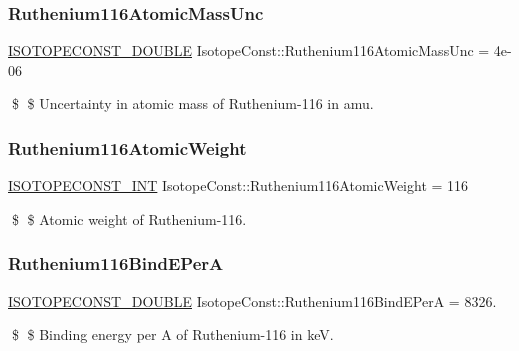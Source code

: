 \subsubsection{\texorpdfstring{Ruthenium116\+Atomic\+Mass\+Unc}{Ruthenium116AtomicMassUnc}}
{\footnotesize\ttfamily \mbox{\hyperlink{group___isotope_const-_macros_ga8f45a7272ce02c0b4c65c44636ed719a}{I\+S\+O\+T\+O\+P\+E\+C\+O\+N\+S\+T\+\_\+\+D\+O\+U\+B\+LE}} Isotope\+Const\+::\+Ruthenium116\+Atomic\+Mass\+Unc = 4e-\/06}

\$ \$ Uncertainty in atomic mass of Ruthenium-\/116 in amu. \mbox{\label{group___isotope_const-_ruthenium-_ru116_gaf58f30cfdf4ac157334e8364e450cefe}} 
\subsubsection{\texorpdfstring{Ruthenium116\+Atomic\+Weight}{Ruthenium116AtomicWeight}}
{\footnotesize\ttfamily \mbox{\hyperlink{group___isotope_const-_macros_ga5f18360b3e99483a35c32d789e62621c}{I\+S\+O\+T\+O\+P\+E\+C\+O\+N\+S\+T\+\_\+\+I\+NT}} Isotope\+Const\+::\+Ruthenium116\+Atomic\+Weight = 116}

\$ \$ Atomic weight of Ruthenium-\/116. \mbox{\label{group___isotope_const-_ruthenium-_ru116_gab1f11004ec8e5734d47ea354e2656ee9}} 
\subsubsection{\texorpdfstring{Ruthenium116\+Bind\+E\+PerA}{Ruthenium116BindEPerA}}
{\footnotesize\ttfamily \mbox{\hyperlink{group___isotope_const-_macros_ga8f45a7272ce02c0b4c65c44636ed719a}{I\+S\+O\+T\+O\+P\+E\+C\+O\+N\+S\+T\+\_\+\+D\+O\+U\+B\+LE}} Isotope\+Const\+::\+Ruthenium116\+Bind\+E\+PerA = 8326.}

\$ \$ Binding energy per A of Ruthenium-\/116 in keV. \mbox{\label{group___isotope_const-_ruthenium-_ru116_gad9827ee3decf233e66b58081dc1f395a}} 
